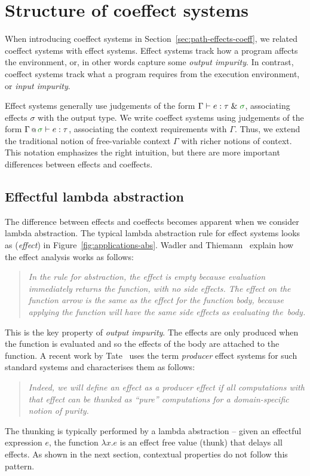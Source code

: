 \section{Structure of coeffect systems}
\label{sec:applications-structure}

When introducing coeffect systems in Section~\ref{sec:path-effects-coeff}, we related coeffect systems
with effect systems. Effect systems track how a program affects the environment, or, in other words 
capture some \emph{output impurity}. In contrast, coeffect systems track what a program requires from 
the execution environment, or \emph{input impurity}.

Effect systems generally use judgements of the form $\Gamma \vdash e : \tau \;\&\; \cclrd{\sigma}$, 
associating effects $\sigma$ with the output type. We write coeffect 
systems using judgements of the form $\coctx{\Gamma}{\cclrd{\sigma}} \vdash e : \tau$, associating
the context requirements with $\Gamma$. Thus, we extend the traditional notion of free-variable
context $\Gamma$ with richer notions of context. This notation emphasizes the right intuition, 
but there are more important differences between effects and coeffects.


\subsection{Effectful lambda abstraction}
\label{sec:applications-structure-lam}

The difference between effects and coeffects becomes apparent when we consider lambda abstraction.
The typical lambda abstraction rule for effect systems looks as (\emph{effect}) in 
Figure~\ref{fig:applications-abs}. Wadler and Thiemann~\cite{monads-effects-marriage} explain how 
the effect analysis works as follows:
%
\begin{quote}
\emph{In the rule for abstraction, the effect is empty because evaluation immediately
returns the function, with no side effects. The effect on the function arrow
is the same as the effect for the function body, because applying the function will
have the same side effects as evaluating the~body.}
\end{quote}
%
This is the key property of \emph{output impurity}. The effects are only produced when the
function is evaluated and so the effects of the body are attached to the function. A recent
work by Tate~\cite{effects-producer-semantics} uses the term \emph{producer} effect systems
for such standard systems and characterises them as follows:
%
\begin{quote}
\emph{Indeed, we will define an effect as a producer effect if all computations with that 
effect can be thunked as ``pure'' computations for a domain-specific notion of purity.}
\end{quote} 
%
The thunking is typically performed by a lambda abstraction -- given an effectful expression 
$e$, the function $\lambda x.e$ is an effect free value (thunk) that delays all effects.
As shown in the next section, contextual properties do not follow this pattern.

